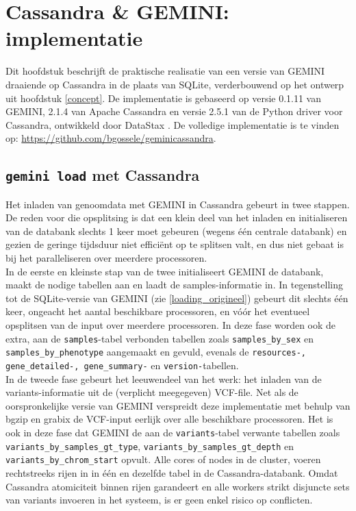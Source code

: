 \chapter{Cassandra \& GEMINI: implementatie}
\label{implementatie}

Dit hoofdstuk beschrijft de praktische realisatie van een versie van GEMINI draaiende op Cassandra in de plaats van SQLite, verderbouwend op het ontwerp uit hoofdstuk \ref{concept}. De implementatie is gebaseerd op versie 0.1.11 van GEMINI, 2.1.4 van Apache Cassandra en versie 2.5.1 van de Python driver voor Cassandra, ontwikkeld door DataStax \cite{cassandra_driver}. De volledige implementatie is te vinden op: \url{https://github.com/bgossele/geminicassandra}.

\section{\texttt{gemini load} met Cassandra}
Het inladen van genoomdata met GEMINI in Cassandra gebeurt in twee stappen. De reden voor die opsplitsing is dat een klein deel van het inladen en initialiseren van de databank slechts 1 keer moet gebeuren (wegens \'e\'en centrale databank) en gezien de geringe tijdsduur niet effici\"ent op te splitsen valt, en dus niet gebaat is bij het paralleliseren over meerdere processoren. \\In de eerste en kleinste stap van de twee initialiseert GEMINI de databank, maakt de nodige tabellen aan en laadt de samples-informatie in. In tegenstelling tot de SQLite-versie van GEMINI (zie \ref{loading_origineel}) gebeurt dit slechts \'e\'en keer, ongeacht het aantal beschikbare processoren, en v\'o\'or het eventueel opsplitsen van de input over meerdere processoren. In deze fase worden ook de extra, aan de \texttt{samples}-tabel verbonden tabellen zoals \texttt{samples\_by\_sex} en \texttt{samples\_by\_phenotype} aangemaakt en gevuld, evenals de \texttt{resources-, gene\_detailed-, gene\_summary-} en \texttt{version-}tabellen.\\
In de tweede fase gebeurt het leeuwendeel van het werk: het inladen van de variants-informatie uit de (verplicht meegegeven) VCF-file. Net als de oorspronkelijke versie van GEMINI verspreidt deze implementatie met behulp van bgzip \cite{bgzip} en grabix \cite{grabix} de VCF-input eerlijk over alle beschikbare processoren. Het is ook in deze fase dat GEMINI de aan de \texttt{variants}-tabel verwante tabellen zoals \texttt{variants\_by\_samples\_gt\_type}, \texttt{variants\_by\_samples\_gt\_depth} en \\ \texttt{variants\_by\_chrom\_start} opvult. Alle cores of nodes in de cluster, voeren rechtstreeks rijen in in \'e\'en en dezelfde tabel in de Cassandra-databank. Omdat Cassandra atomiciteit binnen rijen garandeert en alle workers strikt disjuncte sets van variants invoeren in het systeem, is er geen enkel risico op conflicten.\\\\
